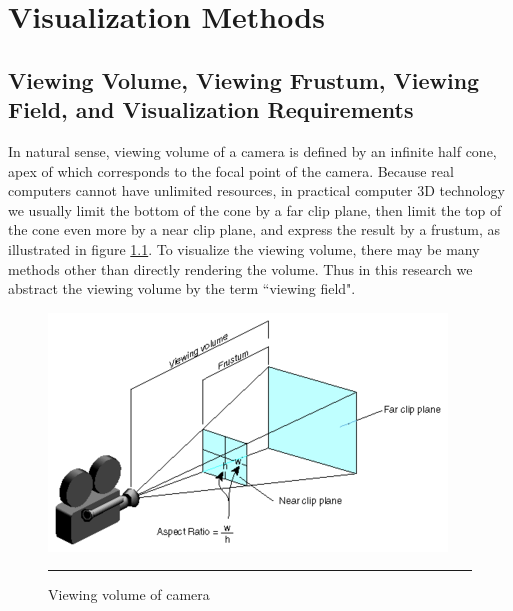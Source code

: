 \chapter{Visualization Methods}
\label{Chapter3}

\section{Viewing Volume, Viewing Frustum, Viewing Field, and Visualization Requirements}
\label{VisualizationRequirements}

In natural sense, viewing volume of a camera is defined by an infinite half cone, apex of which corresponds to the focal point of the camera. Because real computers cannot have unlimited resources, in practical computer 3D technology we usually limit the bottom of the cone by a far clip plane, then limit the top of the cone even more by a near clip plane, and express the result by a frustum, as illustrated in figure \ref{fig:ViewingVolume}. To visualize the viewing volume, there may be many methods other than directly rendering the volume. Thus in this research we abstract the viewing volume by the term ``viewing field".

\begin{figure}[htbp]
	\centering
	\includegraphics{./Primitives/viewing_volume.png}
	\rule{35em}{0.5pt}
	\caption[Viewing volume of camera]{Viewing volume of camera}
	\label{fig:ViewingVolume}
\end{figure}

